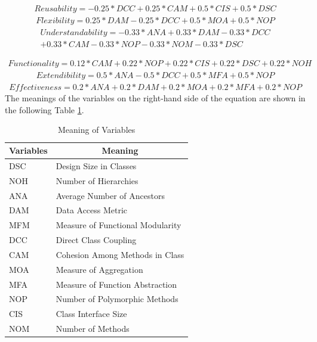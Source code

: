 \documentclass[pdflatex,sn-mathphys-num]{sn-jnl}%
\theoremstyle{thmstyleone}%
\theoremstyle{thmstyletwo}%
\theoremstyle{thmstylethree}%
\begin{document}
\begin{gather*}
    Reusability = -0.25 * DCC + 0.25 * CAM + 0.5 * CIS + 0.5 * DSC
\end{gather*}
\begin{gather*}
    Flexibility = 0.25 * DAM - 0.25 * DCC + 0.5 * MOA + 0.5 * NOP
\end{gather*}
\begin{gather*}
    Understandability = -0.33 * ANA + 0.33 * DAM - 0.33 * DCC \\
    + 0.33 * CAM - 0.33 * NOP - 0.33 * NOM - 0.33 * DSC
\end{gather*}

\begin{gather*}   
    Functionality = 0.12 * CAM + 0.22 * NOP + 0.22 * CIS + 0.22 * DSC + 0.22 * NOH
\end{gather*}
\begin{gather*}    
    Extendibility = 0.5 * ANA - 0.5 * DCC + 0.5 * MFA + 0.5 * NOP
\end{gather*}
\begin{gather*}    
    Effectiveness = 0.2 * ANA + 0.2 * DAM + 0.2 * MOA + 0.2 * MFA + 0.2 * NOP
\end{gather*}
The meanings of the variables on the right-hand side of the equation are shown in the following Table \ref{VariablesMeaning}.

\begin{table}[!htb]
\caption{Meaning of Variables}
\label{VariablesMeaning}
\begin{tabular}{|l|l|}
\hline
\multicolumn{1}{|c|}{\textbf{Variables}} & \multicolumn{1}{c|}{\textbf{Meaning}} \\ \hline
DSC                                      & Design Size in Classes                \\ \hline
NOH                                      & Number of Hierarchies                 \\ \hline
ANA                                      & Average Number of Ancestors           \\ \hline
DAM                                      & Data Access Metric                    \\ \hline
MFM                                      & Measure of Functional Modularity      \\ \hline
DCC                                      & Direct Class Coupling                 \\ \hline
CAM                                      & Cohesion Among Methods in Class       \\ \hline
MOA                                      & Measure of Aggregation                \\ \hline
MFA                                      & Measure of Function Abstraction       \\ \hline
NOP                                      & Number of Polymorphic Methods         \\ \hline
CIS                                      & Class Interface Size                  \\ \hline
NOM                                      & Number of Methods                     \\ \hline
\end{tabular}
\end{table}
\end{document}
